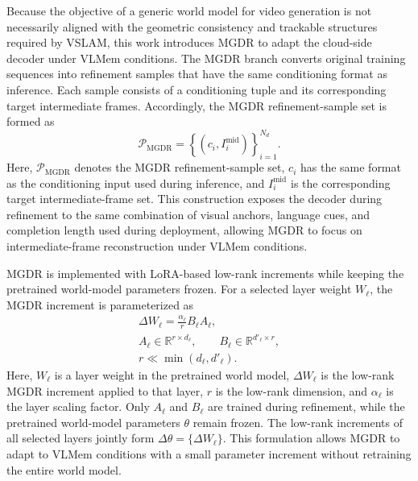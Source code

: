 \documentclass[journal]{IEEEtran}
\begin{document}
Because the objective of a generic world model for video generation is not necessarily aligned with the geometric consistency and trackable structures required by VSLAM, this work introduces MGDR to adapt the cloud-side decoder under VLMem conditions. The MGDR branch converts original training sequences into refinement samples that have the same conditioning format as inference. Each sample consists of a conditioning tuple and its corresponding target intermediate frames. Accordingly, the MGDR refinement-sample set is formed as
\begin{equation}
\mathcal{P}_{\mathrm{MGDR}}
=
\left\{
\left(c_i,I_i^{\mathrm{mid}}\right)
\right\}_{i=1}^{N_d}.
\label{eq:refinement_pairs}
\end{equation}
Here, \(\mathcal{P}_{\mathrm{MGDR}}\) denotes the MGDR refinement-sample set, \(c_i\) has the same format as the conditioning input used during inference, and \(I_i^{\mathrm{mid}}\) is the corresponding target intermediate-frame set. This construction exposes the decoder during refinement to the same combination of visual anchors, language cues, and completion length used during deployment, allowing MGDR to focus on intermediate-frame reconstruction under VLMem conditions.

MGDR is implemented with LoRA-based low-rank increments while keeping the pretrained world-model parameters frozen. For a selected layer weight \(W_\ell\), the MGDR increment is parameterized as
\begin{equation}
\begin{gathered}
\Delta W_{\ell}=
\frac{\alpha_\ell}{r}
B_\ell A_\ell,\\
A_\ell\in\mathbb{R}^{r\times d_\ell},
\qquad
B_\ell\in\mathbb{R}^{d'_\ell\times r},\\
r\ll \min(d_\ell,d'_\ell).
\end{gathered}
\label{eq:lora_refinement_space}
\end{equation}
Here, \(W_\ell\) is a layer weight in the pretrained world model, \(\Delta W_\ell\) is the low-rank MGDR increment applied to that layer, \(r\) is the low-rank dimension, and \(\alpha_\ell\) is the layer scaling factor. Only \(A_\ell\) and \(B_\ell\) are trained during refinement, while the pretrained world-model parameters \(\theta\) remain frozen. The low-rank increments of all selected layers jointly form \(\Delta\theta=\{\Delta W_\ell\}\). This formulation allows MGDR to adapt to VLMem conditions with a small parameter increment without retraining the entire world model.
\end{document}
